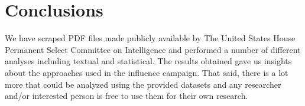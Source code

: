 \documentclass[12pt]{article}
\theoremstyle{definition}
\begin{document}
\section*{\centering Conclusions}

We have scraped PDF files made publicly available by The United States House
Permanent Select Committee on Intelligence and performed a number of different
analyses including textual and statistical. The results obtained gave us
insights about the approaches used in the influence campaign. That said, there
is a lot more that could be analyzed using the provided datasets and any
researcher and/or interested person is free to use them for their own research.


\newpage

\begin{center}
\printbibliography[heading=bibintoc]
\end{center}

\end{document}
